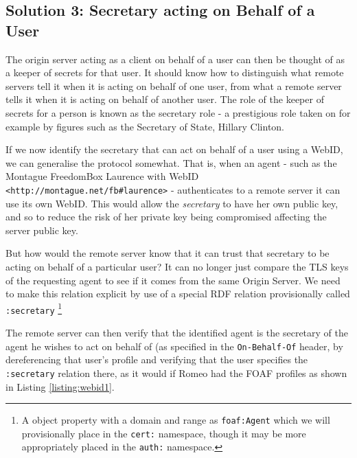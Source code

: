 \documentclass[a4paper]{llncs}
\begin{document}

\subsection{Solution 3: Secretary acting on Behalf of a User}

The origin server acting as a client on behalf of a user can then be thought of as a keeper of secrets for that user.
It should know how to distinguish what remote servers tell it when it is acting on behalf of one user, from what a remote server tells it when it is acting on behalf of another user.
The role of the keeper of secrets for a person is known as the secretary role - a prestigious role taken on for example by figures such as the Secretary of State, Hillary Clinton.

If we now identify the secretary that can act on behalf of a user using a WebID, we can generalise the protocol somewhat.
That is, when an agent - such as the Montague FreedomBox Laurence with WebID \lstinline|<http://montague.net/fb#laurence>| - authenticates to a remote server it can use its own WebID. 
This would allow the \textit{secretary} to have her own public key, and so to reduce the risk of her private key being compromised affecting the server public key.

But how would the remote server know that it can trust that secretary to be acting on behalf of a particular user?
It can no longer just compare the TLS keys of the requesting agent to see if it comes from the same Origin Server.
We need to make this relation explicit by use of a special RDF relation provisionally called \lstinline|:secretary|%
\footnote{A object property with a domain and range as \lstinline|foaf:Agent| which we will provisionally place
in the \lstinline|cert:| namespace, though it may be more appropriately placed in the \lstinline|auth:| namespace.}

%

The remote server can then verify that the identified agent is the secretary of the agent he wishes to act on behalf of (as specified in the \lstinline|On-Behalf-Of| header, by dereferencing that user's profile and verifying that the user specifies the \lstinline|:secretary| relation there, as it would if Romeo had the FOAF profiles as shown in Listing \ref{listing:webid1}.
\end{document}
